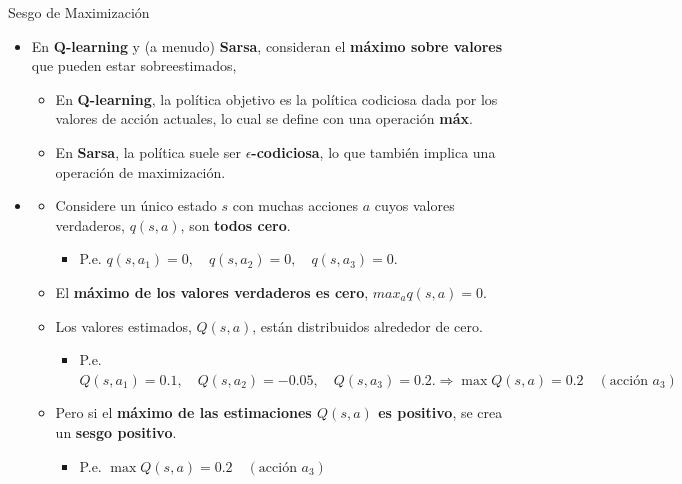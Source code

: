 \documentclass[10pt, envcountsect, handout, aspectratio=1610, hyperref={hypertexnames=true}]{beamer}
\begin{document}
\begin{frame}{Sesgo de Maximización}
	
	\begin{itemize}
		\item En \textbf{Q-learning} y (a menudo) \textbf{Sarsa}, consideran el \textbf{máximo sobre valores} que pueden estar sobreestimados, 
		\begin{itemize}
			\item En \textbf{Q-learning}, la política objetivo es la política codiciosa dada por los valores de acción actuales, lo cual se define con una operación \textbf{máx}.  
			\item En \textbf{Sarsa}, la política suele ser \textbf{$\epsilon$-codiciosa}, lo que también implica una operación de maximización.
		\end{itemize}
		
		\item {}
		\begin{itemize}
			\item Considere un único estado $s$ con muchas acciones $a$ cuyos valores verdaderos, $q(s, a)$, son \textbf{todos cero}.
			
			\begin{itemize}
				\item P.e. $q(s, a_1) = 0, \quad q(s, a_2) = 0, \quad q(s, a_3) = 0.$
			\end{itemize}
			
			\item El \textbf{máximo de los valores verdaderos es cero}, $max_a q(s,a)=0$.
			
			\item Los valores estimados, $Q(s, a)$, están distribuidos alrededor de cero. 
			\begin{itemize}
				\item P.e. $Q(s, a_1) = 0.1, \quad Q(s, a_2) = -0.05, \quad Q(s, a_3) = 0.2. \Rightarrow \max Q(s, a) = 0.2 \quad (\text{acción } a_3)$
			\end{itemize} 
			
			\item Pero si el \textbf{máximo de las estimaciones $Q(s,a)$ es positivo}, se crea un \textbf{sesgo positivo}.
			
			\begin{itemize}
				\item P.e. $\max Q(s, a) = 0.2 \quad (\text{acción } a_3)$
			\end{itemize}
			

\end{itemize}
\end{itemize}
\end{frame}
\end{document}
